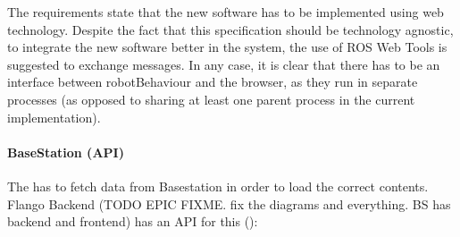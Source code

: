 The requirements state that the new software has to be implemented using web technology. 
Despite the fact that this specification should be technology agnostic, to integrate the new software better in the system, the use of \ac{ROS} Web Tools is suggested to exchange messages.
In any case, it is clear that there has to be an interface between robotBehaviour and the browser, as they run in separate processes (as opposed to sharing at least one parent process in the current implementation).

\paragraph{BaseStation (\flangobe \ac{API})} The \cm has to fetch data from Basestation in order to load the correct contents.
Flango Backend (TODO EPIC FIXME. fix the diagrams and everything. BS has backend and frontend) has an API for this ():

